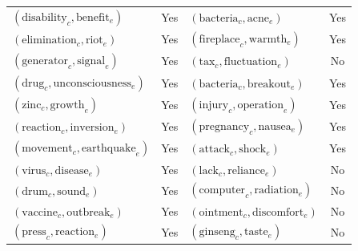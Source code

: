 \begin{table}[bht]
\begin{tabular}{| l c | l c |}
$(\text{disability}_c, \text{benefit}_e)$ & Yes & $(\text{bacteria}_c, \text{acne}_e)$ & Yes \\
$(\text{elimination}_c, \text{riot}_e)$ & Yes & $(\text{fireplace}_c, \text{warmth}_e)$ & Yes \\
$(\text{generator}_c, \text{signal}_e)$ & Yes & $(\text{tax}_c, \text{fluctuation}_e)$ & No \\
$(\text{drug}_c, \text{unconsciousness}_e)$ & Yes & $(\text{bacteria}_c, \text{breakout}_e)$ & Yes \\
$(\text{zinc}_c, \text{growth}_e)$ & Yes & $(\text{injury}_c, \text{operation}_e)$ & Yes \\
$(\text{reaction}_c, \text{inversion}_e)$ & Yes & $(\text{pregnancy}_c, \text{nausea}_e)$ & Yes \\
$(\text{movement}_c, \text{earthquake}_e)$ & Yes & $(\text{attack}_c, \text{shock}_e)$ & Yes \\
$(\text{virus}_c, \text{disease}_e)$ & Yes & $(\text{lack}_c, \text{reliance}_e)$ & No \\
$(\text{drum}_c, \text{sound}_e)$ & Yes & $(\text{computer}_c, \text{radiation}_e)$ & No \\
$(\text{vaccine}_c, \text{outbreak}_e)$ & Yes & $(\text{ointment}_c, \text{discomfort}_e)$ & No \\
$(\text{press}_c, \text{reaction}_e)$ & Yes & $(\text{ginseng}_c, \text{taste}_e)$ & No \\

\hline
\end{tabular}
\end{table}

